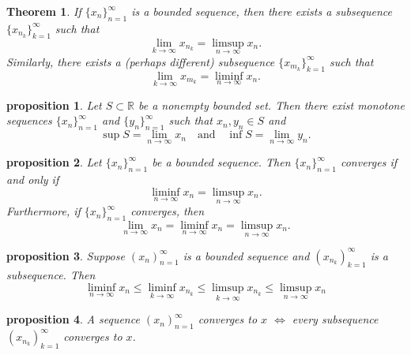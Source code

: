\documentclass{article}
\newtheorem{theorem}{Theorem}[section]
\newtheorem{proposition}{Proposition}[section]
\newtheorem{proposition}{proposition}[section]
\theoremstyle{definition}
\theoremstyle{remark}
\begin{document}
\begin{theorem}\label{thm: lim sup lim inf subsequence}
If \( \{x_n\}_{n=1}^{\infty} \) is a bounded sequence, then there exists a subsequence \( \{x_{n_k}\}_{k=1}^{\infty} \) such that
\[
\lim_{k \to \infty} x_{n_k} = \limsup_{n \to \infty} x_n.
\]
Similarly, there exists a (perhaps different) subsequence \( \{x_{m_k}\}_{k=1}^{\infty} \) such that
\[
\lim_{k \to \infty} x_{m_k} = \liminf_{n \to \infty} x_n.
\]
\end{theorem}







\begin{proposition}\label{ex: sup inf monotone sequence}
Let \( S \subset \mathbb{R} \) be a nonempty bounded set. Then there exist monotone sequences \( \{x_n\}_{n=1}^{\infty} \) and \( \{y_n\}_{n=1}^{\infty} \) such that \( x_n, y_n \in S \) and
\[
\sup S = \lim_{n \to \infty} x_n \quad \text{and} \quad \inf S = \lim_{n \to \infty} y_n.
\]
\end{proposition}








\begin{proposition} \label{prp: convergence criterion lim inf lim sup}
Let \( \{x_n\}_{n=1}^{\infty} \) be a bounded sequence. Then \( \{x_n\}_{n=1}^{\infty} \) converges if and only if
\[
\liminf_{n \to \infty} x_n = \limsup_{n \to \infty} x_n.
\]
\textit{Furthermore, if} \( \{x_n\}_{n=1}^{\infty} \) \textit{converges, then}
\[
\lim_{n \to \infty} x_n = \liminf_{n \to \infty} x_n = \limsup_{n \to \infty} x_n.
\]
\end{proposition}








\begin{proposition}
Suppose $ (x_n)^\infty_{n=1}$ is a bounded sequence and $ (x_{n_k})^\infty_{k = 1}$ is a subsequence. Then
\[
\liminf_{n \to \infty} x_n \leq \liminf_{k \to \infty} x_{n_k} \leq \limsup_{k \to \infty} x_{n_k} \leq \limsup_{n \to \infty} x_n
\]
\end{proposition}


\begin{proposition}
A sequence $ (x_n)^\infty_{n=1}$ converges to $x$ $\iff$ every subsequence $ (x_{n_k})^\infty_{k = 1}$ converges to $x$.
\end{proposition}
\end{document}
